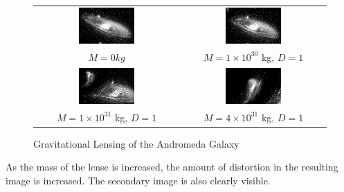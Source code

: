 \documentclass[a4paper]{IEEEtran}
\begin{document}
\begin{figure}
    \caption{Gravitational Lensing of the Andromeda Galaxy} 
    \label{fig:andromeda} 
\begin{center}
    \begin{tabular}{cc} 
    \includegraphics[width=0.4\textwidth]{pics/andromeda.eps}  &
    \includegraphics[width=0.4\textwidth]{pics/1e30and.eps}  \\
    $M = 0 kg$ & $M = 1 \times 10^{30}$ kg, $D = 1$ \\ 
    \includegraphics[width=0.4\textwidth]{pics/1e31and.eps}  &
    \includegraphics[width=0.4\textwidth]{pics/4e31and.eps} \\
    $M = 1 \times 10^{31}$ kg, $D = 1$ &  $M = 4 \times 10^{31}$ kg, $D = 1$ \\ 
    \end{tabular} 
\end{center}
\end{figure}

As the mass of the lense is increased, the amount of distortion in the
resulting image is increased. The secondary image is also clearly visible.
\end{document}
